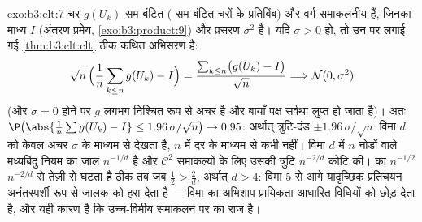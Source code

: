 \begin{solution}{exo:b3:clt:7}
चर $g(U_k)$  सम-बंटित ( सम-बंटित चरों के
 प्रतिबिंब) और वर्ग-समाकलनीय हैं, जिनका माध्य $I$
(अंतरण प्रमेय, \cref{exo:b3:product:9}) और प्रसरण
$\sigma^2$ है। यदि $\sigma > 0$ हो, तो उन पर लगाई गई
\cref{thm:b3:clt:clt} ठीक कथित अभिसरण है:
\[
\sqrt n\,\Bigl(\frac1n\sum_{k\leq n}g(U_k) - I\Bigr) =
\frac{\sum_{k\leq n}\bigl(g(U_k) - I\bigr)}{\sqrt n}
\Longrightarrow \mathcal N(0, \sigma^2)
\]
(और $\sigma = 0$ होने पर $g$ लगभग निश्चित रूप से अचर है और
बायाँ पक्ष सर्वथा लुप्त हो जाता है)। अतः
$\P\bigl(\abs{\frac1n\sum g(U_k) - I} \leq
1.96\,\sigma/\sqrt n\bigr) \to 0.95$: अर्थात् त्रुटि-दंड
$\pm 1.96\,\sigma/\sqrt n$ विमा $d$ को केवल अचर $\sigma$ के
माध्यम से देखता है, $n$ में दर के माध्यम से कभी नहीं। विमा
$d$ में $n$ नोडों वाले मध्यबिंदु नियम का जाल $n^{-1/d}$ है
और $\mathcal C^2$ समाकल्यों के लिए उसकी त्रुटि $n^{-2/d}$
कोटि की।  का $n^{-1/2}$ $n^{-2/d}$ से तेज़ी से
घटता है ठीक तब जब $\frac12 > \frac2d$, अर्थात् $d > 4$:
विमा $5$ से आगे यादृच्छिक प्रतिचयन अनंतस्पर्शी रूप से जालक
को हरा देता है --- विमा का अभिशाप प्रायिकता-आधारित विधियों
को छोड़ देता है, और यही कारण है कि उच्च-विमीय समाकलन पर
 का राज है।
\end{solution}

